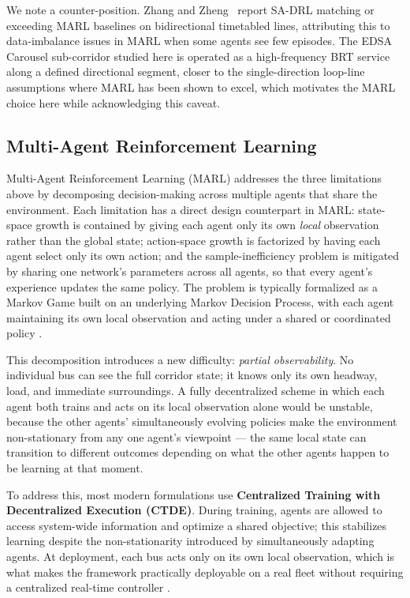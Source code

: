 We note a counter-position. Zhang and Zheng~\cite{Zhang2025SADRL} report SA-DRL matching or exceeding MARL baselines on bidirectional timetabled lines, attributing this to data-imbalance issues in MARL when some agents see few episodes. The EDSA Carousel sub-corridor studied here is operated as a high-frequency BRT service along a defined directional segment, closer to the single-direction loop-line assumptions where MARL has been shown to excel, which motivates the MARL choice here while acknowledging this caveat.

\subsection{Multi-Agent Reinforcement Learning}
Multi-Agent Reinforcement Learning (MARL) addresses the three limitations above by decomposing decision-making across multiple agents that share the environment. Each limitation has a direct design counterpart in MARL: state-space growth is contained by giving each agent only its own \textit{local} observation rather than the global state; action-space growth is factorized by having each agent select only its own action; and the sample-inefficiency problem is mitigated by sharing one network's parameters across all agents, so that every agent's experience updates the same policy. The problem is typically formalized as a Markov Game built on an underlying Markov Decision Process, with each agent maintaining its own local observation and acting under a shared or coordinated policy \cite{Li2023Departure,Sun2024Graph,Zuo2026AGV,Huang2025Joint,Bokade2023MARL}.

This decomposition introduces a new difficulty: \textit{partial observability}. No individual bus can see the full corridor state; it knows only its own headway, load, and immediate surroundings. A fully decentralized scheme in which each agent both trains and acts on its local observation alone would be unstable, because the other agents' simultaneously evolving policies make the environment non-stationary from any one agent's viewpoint --- the same local state can transition to different outcomes depending on what the other agents happen to be learning at that moment.

To address this, most modern formulations use \textbf{Centralized Training with Decentralized Execution (CTDE)}. During training, agents are allowed to access system-wide information and optimize a shared objective; this stabilizes learning despite the non-stationarity introduced by simultaneously adapting agents. At deployment, each bus acts only on its own local observation, which is what makes the framework practically deployable on a real fleet without requiring a centralized real-time controller \cite{Cao2022Train,Wang2024MultiAGV,Nie2025CMRM,Xu2026Hierarchical}.

